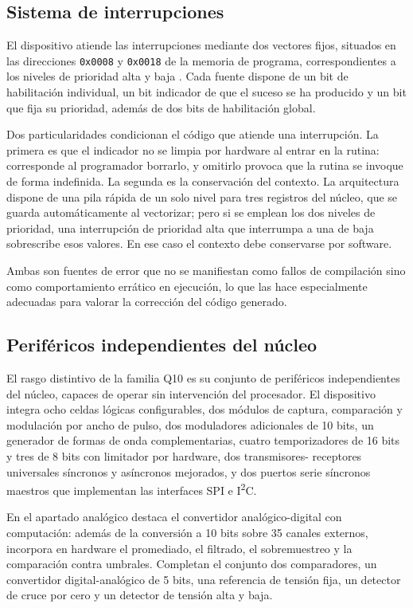 \subsection{Sistema de interrupciones}

El dispositivo atiende las interrupciones mediante dos vectores fijos, situados
en las direcciones \texttt{0x0008} y \texttt{0x0018} de la memoria de programa,
correspondientes a los niveles de prioridad alta y baja
\cite{microchip2024ds40002043}. Cada fuente dispone de un bit de habilitación
individual, un bit indicador de que el suceso se ha producido y un bit que fija
su prioridad, además de dos bits de habilitación global.

Dos particularidades condicionan el código que atiende una interrupción. La
primera es que el indicador no se limpia por hardware al entrar en la rutina:
corresponde al programador borrarlo, y omitirlo provoca que la rutina se invoque
de forma indefinida. La segunda es la conservación del contexto. La arquitectura
dispone de una pila rápida de un solo nivel para tres registros del núcleo, que
se guarda automáticamente al vectorizar; pero si se emplean los dos niveles de
prioridad, una interrupción de prioridad alta que interrumpa a una de baja
sobrescribe esos valores. En ese caso el contexto debe conservarse por software.

Ambas son fuentes de error que no se manifiestan como fallos de compilación sino
como comportamiento errático en ejecución, lo que las hace especialmente
adecuadas para valorar la corrección del código generado.

\subsection{Periféricos independientes del núcleo}

El rasgo distintivo de la familia Q10 es su conjunto de periféricos
independientes del núcleo, capaces de operar sin intervención del procesador. El
dispositivo integra ocho celdas lógicas configurables, dos módulos de captura,
comparación y modulación por ancho de pulso, dos moduladores adicionales de
10 bits, un generador de formas de onda complementarias, cuatro temporizadores
de 16 bits y tres de 8 bits con limitador por hardware, dos transmisores-%
receptores universales síncronos y asíncronos mejorados, y dos puertos serie
síncronos maestros que implementan las interfaces SPI e I\textsuperscript{2}C.

En el apartado analógico destaca el convertidor analógico-digital con
computación: además de la conversión a 10 bits sobre 35 canales externos,
incorpora en hardware el promediado, el filtrado, el sobremuestreo y la
comparación contra umbrales. Completan el conjunto dos comparadores, un
convertidor digital-analógico de 5 bits, una referencia de tensión fija, un
detector de cruce por cero y un detector de tensión alta y baja.

